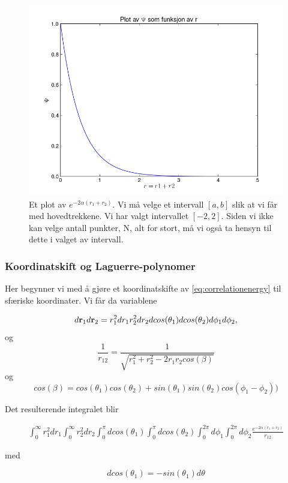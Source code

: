 \documentclass[11pt]{article}
\begin{document}
\begin{figure}[ht]
  \centering
  \includegraphics[scale=0.7]{../fig/psiPlot.png}
  \caption{\label{fig:PSI} Et plot av  $e^{-2\alpha (r_1+r_2)}$. Vi må velge
et intervall $[a,b]$ slik at vi får med hovedtrekkene. Vi har valgt 
intervallet $[-2,2]$. Siden vi ikke kan velge antall punkter, N,
alt for stort, må vi også ta hensyn til dette i valget av intervall.}
\end{figure}


\subsubsection{Koordinatskift og Laguerre-polynomer}
Her begynner vi med å gjøre et koordinatskifte av 
\eqref{eq:correlationenergy} til sfæriske koordinater. Vi får da variablene

\[
   d{\bf r}_1d{\bf r}_2  = r_1^2dr_1 r_2^2dr_2 dcos(\theta_1)dcos(\theta_2)d\phi_1d\phi_2,
\]
og
\[
   \frac{1}{r_{12}}= \frac{1}{\sqrt{r_1^2+r_2^2-2r_1r_2cos(\beta)}}
\]
og 
\[
cos(\beta) = cos(\theta_1)cos(\theta_2)+sin(\theta_1)sin(\theta_2)cos(\phi_1-\phi_2))
\]

Det resulterende integralet blir

\begin{align}
\int_{0}^{\infty} r_1^2 dr_1 \int_{0}^{\infty} r_2^2 dr_2
\int_{0}^{\pi} dcos(\theta_1) \int_{0}^{\pi} dcos(\theta_2)
\int_{0}^{2\pi} d\phi_1 \int_{0}^{2\pi} d\phi_2 \frac{e^{-2\alpha (r_1+r_2)}}{r_{12}}
\end{align}

med

\[
dcos(\theta_1) = -sin(\theta_1)d\theta
\]
\end{document}
